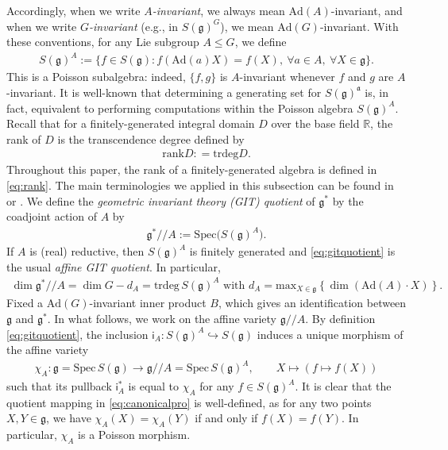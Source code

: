 \documentclass[11pt]{amsart}
\theoremstyle{definition}
\theoremstyle{plain}
\theoremstyle{conclusion}
\begin{document}
Accordingly, when we write \textit{$A$-invariant}, we always mean $\mathrm{Ad}(A)$-invariant, and when we write \textit{$G$-invariant} (e.g., in $S(\mathfrak{g})^G$), we mean $\mathrm{Ad}(G)$-invariant. With these conventions, for any Lie subgroup $A\leq G$, we define \begin{align}
  S(\mathfrak{g})^A := \bigl\{f \in S(\mathfrak{g}) : f(\mathrm{Ad}(a)X)=f(X),\ \forall a\in A,\ \forall X\in \mathfrak{g}\bigr\}. \label{eq:sga}
\end{align} This is a Poisson subalgebra: indeed, $\{f,g\}$ is $A$-invariant whenever $f$ and $g$ are $A$-invariant.  It is well-known that determining a generating set for $S(\mathfrak{g})^{\mathfrak{a}}$ is, in fact, equivalent to performing computations within the Poisson algebra $S(\mathfrak{g})^A$.   Recall that for a finitely-generated integral domain $D$ over the base field $\mathbb{R}$, the rank of $D$ is the transcendence degree defined by \begin{align}
    \mathrm{rank}  D: = \mathrm{trdeg}  D. \label{eq:rank}
\end{align} Throughout this paper, the rank of a finitely-generated algebra is defined in \eqref{eq:rank}.
The main terminologies we applied in this subsection can be found in \cite[Chapter 6]{Dolgachev03} or \cite{Brion2010Actions}.  We define the  \textit{geometric invariant theory (GIT) quotient}  of $\mathfrak{g}^*$ by the coadjoint action of $A$ by \begin{align}
 \mathfrak{g}^*// A := \mathrm{Spec}\bigl(S(\mathfrak{g})^A\bigr). \label{eq:gitquotient}
\end{align}
If $A$ is (real) reductive, then $S(\mathfrak{g})^A$ is finitely generated and \eqref{eq:gitquotient} is the usual \textit{affine GIT quotient}. In particular, \begin{align}
    \dim \mathfrak{g}^*//A = \dim G - d_A   = \mathrm{trdeg}  \, S(\mathfrak{g})^A \text{ with }d_A = {\mathrm{max}}_{ X \in \mathfrak{g}} \left\{\dim (\mathrm{Ad}(A) \cdot X)\right\}. \label{eq:dimgitquo}
\end{align}   Fixed a $\mathrm{Ad}(G)$-invariant inner product $B$, which gives an identification between $\mathfrak{g}$ and $\mathfrak{g}^*$.  In what follows, we work on the affine variety $\mathfrak{g}//A$.  By definition \eqref{eq:gitquotient}, the inclusion $\mathsf{i}_A: S(\mathfrak{g})^A \hookrightarrow S(\mathfrak{g})$ induces a unique morphism of the affine variety \begin{align}
    \chi_A: \mathfrak{g} = \mathrm{Spec} \, S(\mathfrak{g})  \longrightarrow \mathfrak{g}//A = \mathrm{Spec} \, S(\mathfrak{g})^A, \qquad X \longmapsto (f \mapsto f(X)) \label{eq:canonicalpro}
\end{align} such that its pullback $  \mathsf{i}_A^*$ is equal to $\chi_A$ for any $f \in S(\mathfrak{g})^A$.  It is clear that the quotient mapping in \eqref{eq:canonicalpro} is well-defined, as for any two points $X,Y \in \mathfrak{g}$, we have $\chi_A(X) = \chi_A(Y)$ if and only if $f(X) = f(Y)$. In particular, $\chi_A$ is a Poisson morphism. %
\end{document}
